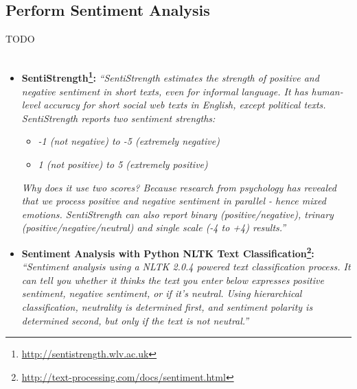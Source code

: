 \subsection{Perform Sentiment Analysis}\label{342_ref}
TODO\\
\\
\begin{itemize}
	\item
	 \textbf{SentiStrength\footnote{\url{http://sentistrength.wlv.ac.uk}}:}
	 \textit{“SentiStrength estimates the strength of positive and negative sentiment in short texts, even for informal language. It has human-level accuracy for short social web texts in English, except political texts. SentiStrength reports two sentiment strengths:}\\

	\begin{itemize}
		\item \textit{-1 (not negative) to -5 (extremely negative)}
		\item \textit{1 (not positive) to 5 (extremely positive)}\\
	\end{itemize}


\textit{Why does it use two scores? Because research from psychology has revealed that we process positive and negative sentiment in parallel - hence mixed emotions.
SentiStrength can also report binary (positive/negative), trinary (positive/negative/neutral) and single scale (-4 to +4) results.”}\\

	\item
	\textbf{Sentiment Analysis with Python NLTK Text Classification\footnote{\url{http://text-processing.com/docs/sentiment.html}}:} 
	\textit{“Sentiment analysis using a NLTK 2.0.4 powered text classification process. It can tell you whether it thinks the text you enter below expresses positive sentiment, negative sentiment, or if it's neutral. Using hierarchical classification, neutrality is determined first, and sentiment polarity is determined second, but only if the text is not neutral.”}
\end{itemize}










